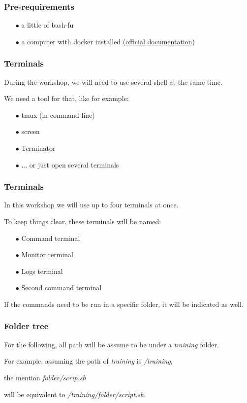 
	\begin{frame}
		\frametitle{Pre-requirements}

		\begin{itemize}
			\item[$\bullet$] a little of bash-fu
			\item[$\bullet$] a computer with docker installed (\href{https://docs.docker.com/v17.09/engine/installation/}{official documentation})
		\end{itemize}
		
	\end{frame}
	
	\begin{frame}
		\frametitle{Terminals}
		
		During the workshop, we will need to use several shell at the same time.
		
		\medskip
		
		We need a tool for that, like for example:
		\begin{itemize}
			\item[$\bullet$] tmux (in command line)
			\item[$\bullet$] screen
			\item[$\bullet$] Terminator
			\item[$\bullet$] ... or just open several terminals
		\end{itemize}
	\end{frame}
	
	\begin{frame}
		\frametitle{Terminals}
		
		In this workshop we will use up to four terminals at once.
		
		\bigskip
		
		To keep things clear, these terminals will be named:
		\begin{itemize}
			\item[$\bullet$] Command terminal
			\item[$\bullet$] Monitor terminal
			\item[$\bullet$] Logs terminal
			\item[$\bullet$] Second command terminal
		\end{itemize}
		
		\bigskip
		
		If the commands need to be run in a specific folder, it will be indicated as well.
	\end{frame}

	\begin{frame}
		\frametitle{Folder tree}
		
		For the following, all path will be assume to be under a \textit{training} folder.
		
		\bigskip
		
		For example, assuming the path of \textit{training} is \textit{/training},
		
		the mention \textit{folder/scrip.sh} 
		
		will be equivalent to \textit{/training/folder/script.sh}.
		
	\end{frame}